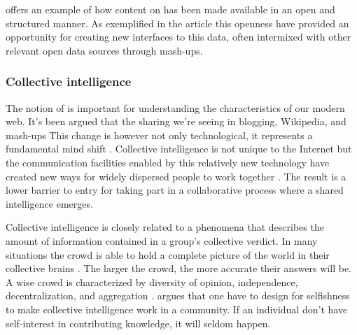 \citet{auer07} offers an example of how content on %
has been made available in an open and structured manner. As exemplified
in the article this openness have provided an opportunity for creating new
interfaces to this data, often intermixed with other relevant open
data sources through mash-ups.

\subsubsection{Collective intelligence}
The notion of  is important for understanding
the characteristics of our modern web. It's been argued that the sharing we're
seeing in blogging, Wikipedia, and mash-ups
This change is however not only technological, it represents a fundamental
mind shift \citep[]{kolbitsch06}.
Collective intelligence is not unique
to the Internet but the communication facilities enabled by this relatively
new technology have created new ways for widely dispersed people to work
together \citep{mitcenter08}. The result is a lower barrier to entry for
taking part in a collaborative process where a shared intelligence emerges.

Collective intelligence is closely related to
\dash{}a phenomena that describes the amount of
information contained in a group's collective verdict.
In many situations the crowd is able to hold a complete picture of the world
in their collective brains \citep[]{surowiecki04}. The larger the
crowd, the more accurate their answers will be.%
A wise crowd is characterized by diversity of opinion, independence,
decentralization, and aggregation \citep[]{surowiecki04}.
\citet{powazek08} argues that one have to design for selfishness to make
collective intelligence work in a community. If an individual don't have
self-interest in contributing knowledge, it will seldom happen.

